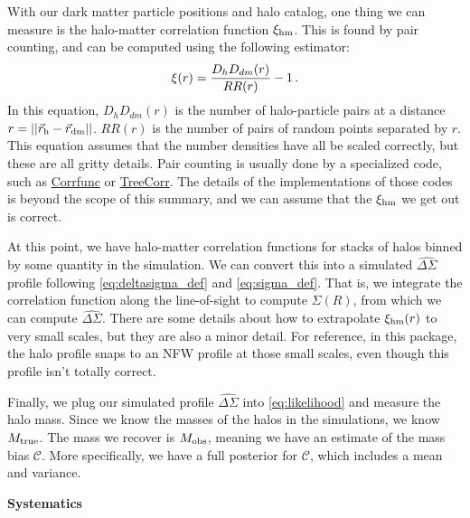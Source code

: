 \documentclass[12pt]{article}
\newcommand{\ds}{\Delta\Sigma}
\begin{document}
With our dark matter particle positions and halo catalog, one thing we can measure is the halo-matter correlation function $\xi_{\rm hm}$. This is found by pair counting, and can be computed using the following estimator:
%
\begin{equation}
	\label{eq:xihm_estimator}
	\xi_{\rm}(r) = \frac{D_hD_{dm}(r)}{RR(r)} - 1\,.
\end{equation}
%
In this equation, $D_hD_{dm}(r)$ is the number of halo-particle pairs at a distance $r = ||\vec{r}_{\rm h} - \vec{r}_{\rm dm}|| $. $RR(r)$ is the number of pairs of random points separated by $r$. This equation assumes that the number densities have all be scaled correctly, but these are all gritty details. Pair counting is usually done by a specialized code, such as \href{https://github.com/manodeep/Corrfunc}{Corrfunc} or \href{https://github.com/rmjarvis/TreeCorr}{TreeCorr}. The details of the implementations of those codes is beyond the scope of this summary, and we can assume that the $\xi_{\rm hm}$ we get out is correct.

At this point, we have halo-matter correlation functions for stacks of halos binned by some quantity in the simulation. We can convert this into a simulated $\hat{\Delta\Sigma}$ profile following \autoref{eq:deltasigma_def} and \autoref{eq:sigma_def}. That is, we integrate the correlation function along the line-of-sight to compute $\Sigma(R)$, from which we can compute $\hat{\ds}$. There are some details about how to extrapolate $\xi_{\rm hm}(r)$ to very small scales, but they are also a minor detail. For reference, in this package, the halo profile snaps to an NFW profile at those small scales, even though this profile isn't totally correct.

Finally, we plug our simulated profile $\hat{\ds}$ into \autoref{eq:likelihood} and measure the halo mass. Since we know the masses of the halos in the simulations, we know $M_{\rm true}$. The mass we recover is $M_{\rm obs}$, meaning we have an estimate of the mass bias $\mathcal{C}$. More specifically, we have a full posterior for $\mathcal{C}$, which includes a mean and variance.

\vspace{12pt}
\noindent
{\bf Systematics}
\end{document}
